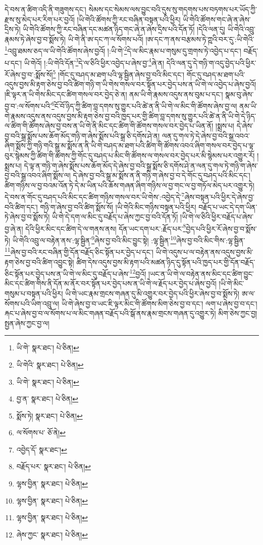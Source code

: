 དེ་བས་ན་ཚིག་འདི་ནི་གཟུགས་དང་། སེམས་དང་སེམས་ལས་བྱུང་བའི་དུས་སུ་གདགས་པས་བཏགས་པར་ཡོད་ཀྱི་རྫས་སུ་མེད་པར་རིག་པར་བྱའོ། །ཡི་གེའི་ཚོགས་ཀྱི་རང་བཞིན་བསྟན་པའི་ཕྱིར། ཡི་གེའི་ཚོགས་གང་ཞེ་ན་ཞེས་དྲིས་ཏེ། ཡི་གེའི་ཚོགས་ཀྱི་རང་བཞིན་དང་མཚན་ཉིད་གང་ཞེ་ན་ཞེས་དྲིས་པའི་དོན་ཏོ། །དེའི་ལན་དུ། ཡི་གེའི་འབྲུ་རྣམས་ཏེ་ཞེས་བྱ་བ་སྨོས་ཏེ། ཡི་གེ་ནི་ཨ་དང་ཀ་ལ་སོགས་པའོ། །ཨ་དང་ཀ་ནས་བརྩམས་ཏེ་ཀྵའི་བར་དུ་:ཡི་གེའི་\footnote{ཡི་གེ་  སྣར་ཐང་།  པེ་ཅིན། }འབྲུ་ཐམས་ཅད་ལ་ཡི་གེའི་ཚོགས་ཞེས་བྱའོ། །:ཡི་གེ་\footnote{ཡི་གེའི་  སྣར་ཐང་།  པེ་ཅིན། }དེ་ལ་མིང་རྣམ་པ་གསུམ་དུ་གྲགས་ཏེ་འབྱེད་པ་དང་། བརྗོད་པ་དང་། ཡི་གེའོ། །:ཡི་གེའི་དོན་\footnote{ཡི་གེ་  སྣར་ཐང་།  པེ་ཅིན། }དེ་ལ་ཅིའི་ཕྱིར་འབྱེད་པ་ཞེས་བྱ་\footnote{བྱ་ན་  སྣར་ཐང་།  པེ་ཅིན། }ཞེ་ན། དེའི་ལན་དུ་དེ་གཉི་ག་འདུ་བྱེད་པའི་ཕྱིར་རོ་ཞེས་བྱ་བ་:སྨོས་སོ།\footnote{སྨོས་ཏེ།  སྣར་ཐང་།  པེ་ཅིན། } །གོང་དུ་བཤད་མ་ཐག་པའི་ལྷ་སྦྱིན་ཞེས་བྱ་བའི་མིང་དང་། གོང་དུ་བཤད་མ་ཐག་པའི་འདུས་བྱས་མི་རྟག་ཅེས་བྱ་བའི་ཚིག་གཉི་ག་ཡི་གེས་གསལ་བར་སྟོན་པར་བྱེད་པས་ན་ཡི་གེ་ལ་འབྱེད་པ་ཞེས་བྱའོ། །ཇི་ལྟར་ན་ཡི་གེས་མིང་དང་ཚིག་གསལ་བར་བྱེད་ཅེ་ན། ནམ་ཡི་གེ་རྣམས་འདུས་ནས་བུམ་པ་དང་། སྣམ་བུ་ཞེས་བྱ་བ་:ལ་སོགས་པའི་\footnote{ལ་སོགས་པ་  ཅོ་ནེ། }ངོ་བོ་ཉིད་ཀྱི་ཚིག་བླ་དགས་སུ་གྱུར་པའི་ཚེ་ན་ནི་ཡི་གེ་ལ་མིང་གི་ཚོགས་ཞེས་བྱ་ལ། ནམ་ཡི་གེ་རྣམས་འདུས་ནས་འདུས་བྱས་མི་རྟག་ཅེས་བྱ་བའི་ཁྱད་པར་གྱི་ཚིག་བླ་དགས་སུ་གྱུར་པའི་ཚེ་ན་ནི་ཡི་གེ་དེ་ཉིད་ལ་ཚིག་གི་ཚོགས་ཞེས་བྱ་བས་ན་ཡི་གེ་ནི་མིང་དང་ཚིག་གི་ཚོགས་གསལ་བར་བྱེད་པ་ཡིན་ནོ། །སྨྲས་པ། དེ་ཞེས་བྱ་བའི་སྒྲ་སྨོས་པས་ཆོག་མོད་གཉི་ག་ཞེས་སྨོས་པའི་སྒྲ་ཅི་དགོས་ཤེ་ན། ལན་དུ་གལ་ཏེ་དེ་ཞེས་བྱ་བའི་སྒྲ་འབའ་ཞིག་སྨོས་ཀྱི་གཉི་གའི་སྒྲ་མ་སྨོས་ན་ནི་ཡི་གེ་བཤད་མ་ཐག་པའི་ཚིག་གི་ཚོགས་འབའ་ཞིག་གསལ་བར་བྱེད་པ་ལྟ་བུར་སྙེམས་ཀྱི་ཚིག་གི་ཚོགས་ཀྱི་གོང་དུ་བཤད་པ་མིང་གི་ཚོགས་ལ་གསལ་བར་བྱེད་པར་མི་སྙེམས་པར་འགྱུར་རོ། །སྨྲས་པ། དེ་ལྟ་ན་གཉི་ག་ཞེས་སྨོས་པས་ཆོག་མོད་དེ་ཞེས་བྱ་བའི་སྒྲ་སྨོས་ཅི་དགོས་ཤེ་ན་ལན་དུ་གལ་ཏེ་གཉི་ག་ཞེས་བྱ་བའི་སྒྲ་འབའ་ཞིག་སྨོས་ལ། དེ་ཞེས་བྱ་བའི་སྒྲ་མ་སྨོས་ན་ནི་གཉི་ག་ཞེས་བྱ་བ་དེ་གོང་དུ་བཤད་པའི་མིང་དང་། ཚིག་གཉིས་ལ་བྱ་བའམ་འོན་ཏེ་དེ་མ་ཡིན་པའི་ཆོས་གཞན་ཞིག་གཉིས་ལ་བྱ་གང་ལ་བྱ་གཏོལ་མེད་པར་འགྱུར་ཏེ། དེ་བས་ན་གོང་དུ་བཤད་པའི་མིང་དང་ཚིག་གཉིས་གསལ་བར་ཡི་གེས་:འབྱེད་དེ་\footnote{འབྱེད་དོ་  སྣར་ཐང་། }ཞེས་བསྟན་པའི་ཕྱིར་དེ་ཞེས་བྱ་བའི་ཚིག་དང་། གཉི་ག་ཞེས་བྱ་བའི་ཚིག་སྨོས་སོ། །ཡི་གེའི་མིང་གཉིས་བསྟན་པའི་ཕྱིར། བརྗོད་པ་ཡང་དེ་དག་ཡིན་ཏེ་ཞེས་བྱ་བ་སྨོས་ཏེ། ཡི་གེ་དེ་དག་ལ་མིང་དུ་བརྗོད་པ་ཞེས་ཀྱང་བྱ་བའི་དོན་ཏོ། །ཡི་གེ་ལ་ཅིའི་ཕྱིར་བརྗོད་པ་ཞེས་བྱ་ཞེ་ན། དེའི་ཕྱིར་མིང་དང་ཚིག་དེ་ལ་གནས་ནས། དོན་ཡང་དག་པར་:རྗོད་པར་\footnote{བརྗོད་པར་  སྣར་ཐང་།  པེ་ཅིན། }བྱེད་པའི་ཕྱིར་རོ་ཞེས་བྱ་བ་སྨོས་ཏེ། ཡི་གེའི་འབྲུ་ལ་བརྟེན་ནས་:ལྷ་སྦྱིན་\footnote{ལྷས་བྱིན་  སྣར་ཐང་།  པེ་ཅིན། }ཞེས་བྱ་བའི་མིང་བྱུང་སྟེ། :ལྷ་སྦྱིན་\footnote{ལྷས་བྱིན་  སྣར་ཐང་།  པེ་ཅིན། }ཞེས་བྱ་བའི་མིང་གིས་:ལྷ་སྦྱིན་\footnote{ལྷས་བྱིན་  སྣར་ཐང་།  པེ་ཅིན། }ཞེས་བྱ་བའི་རང་བཞིན་གྱི་དོན་བརྗོད་ཅིང་སྟོན་པར་བྱེད་པ་དང་། ཡི་གེ་འདུས་པ་ལ་བརྟེན་ནས་འདུས་བྱས་མི་རྟག་ཅེས་བྱ་བའི་ཚིག་འབྱུང་སྟེ། ཚིག་དེས་འདུས་བྱས་མི་རྟག་པའི་མཚན་ཉིད་དུ་སྟོན་པའི་ཁྱད་པར་གྱི་དོན་བརྗོད་ཅིང་སྟོན་པར་བྱེད་པས་ན་ཡི་གེ་ལ་མིང་དུ་བརྗོད་པ་ཞེས་\footnote{ཞེས་ཀྱང་  སྣར་ཐང་།  པེ་ཅིན། }བྱའོ། །ཡང་ན་ཡི་གེ་ལ་བརྟེན་ནས་མིང་དང་ཚིག་བྱུང་མིང་དང་ཚིག་གིས་ནི་དོན་མ་ནོར་བར་སྟོན་པར་བྱེད་པས་ན་ཡི་གེ་ལ་རྗོད་པར་བྱེད་པ་ཞེས་བྱའོ། །ཡི་གེ་མིང་གསུམ་པ་བསྟན་པའི་ཕྱིར། ཡི་གེ་ཡང་རྣམ་གྲངས་གཞན་དུ་མི་འགྱུར་བར་བྱེད་པའི་ཕྱིར་ཞེས་བྱ་བ་སྨོས་ཏེ། ཨ་ལ་སོགས་པའི་ཡིག་འབྲུ་ལ། ཡི་གེ་ཞེས་བྱ་བ་ཡང་ཇི་ལྟར་མིང་གི་ཚོགས་མིག་ཅེས་བྱ་བ་དང་། ལག་པ་ཞེས་བྱ་བ་དང་། རྐང་པ་ཞེས་བྱ་བ་ལ་སོགས་པ་ལ་མིང་གཞན་བརྗོད་པའི་སྒོ་ནས་རྣམ་གྲངས་གཞན་དུ་འགྱུར་ཏེ། མིག་ཅེས་ཀྱང་བྱ། སྤྱན་ཞེས་ཀྱང་བྱ་ལ། 